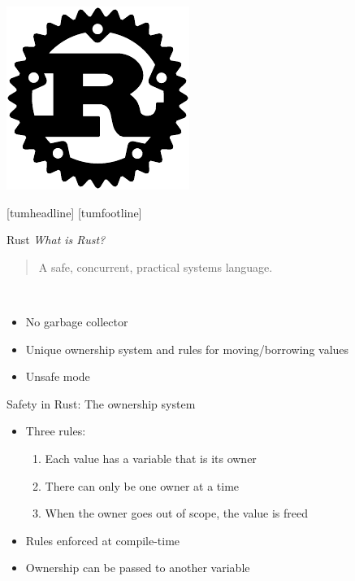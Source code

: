 \documentclass[NET,english,aspectratio=43,notitleframe]{tumbeamer}
\begin{document}
\begin{frame}{}
\centering\includegraphics[height=0.87\textheight]{pics/rust}
\end{frame}
[tumheadline]
[tumfootline]

\begin{frame}{Rust}
\emph{What is Rust?}\\
\begin{quote}
A safe, concurrent, practical systems language.
\end{quote}\\
\begin{itemize}
\item No garbage collector
\item Unique ownership system and rules for moving/borrowing values
\item Unsafe mode
\end{itemize}
\end{frame}

\begin{frame}{Safety in Rust: The ownership system}
\begin{itemize}
\item Three rules:
\begin{enumerate}
\item Each value has a variable that is its owner
\item There can only be one owner at a time
\item When the owner goes out of scope, the value is freed
\end{enumerate}
\item Rules enforced at compile-time
\item Ownership can be passed to another variable%
\end{itemize}
\end{frame}
\end{document}
